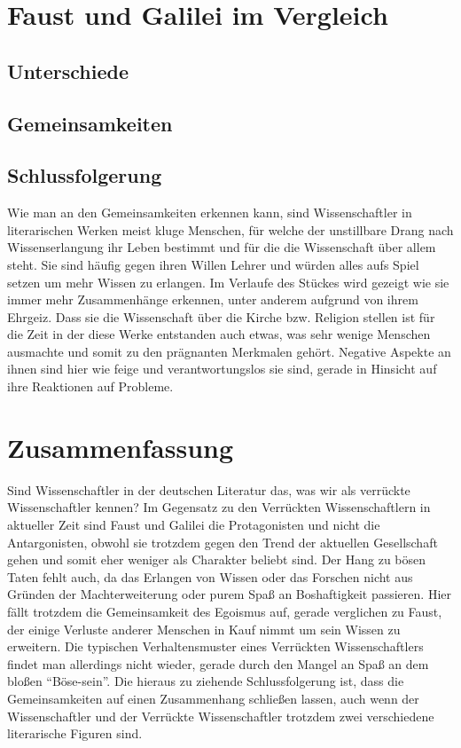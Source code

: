 \documentclass[12pt]{scrreprt}
\begin{document}
\chapter{Faust und Galilei im Vergleich}
	\label{chap:faust galilei vergleich}
\section{Unterschiede}
	\label{sec:unterschiede}

\section{Gemeinsamkeiten}
	\label{sec:gemeinsamkeiten}

\section{Schlussfolgerung}
	\label{sec:schlussfolgerung}
Wie man an den Gemeinsamkeiten erkennen kann, sind Wissenschaftler in literarischen Werken meist kluge Menschen, für welche der unstillbare Drang nach Wissenserlangung ihr Leben bestimmt und für die die Wissenschaft über allem steht.
Sie sind häufig gegen ihren Willen Lehrer und würden alles aufs Spiel setzen um mehr Wissen zu erlangen.
Im Verlaufe des Stückes wird gezeigt wie sie immer mehr Zusammenhänge erkennen, unter anderem aufgrund von ihrem Ehrgeiz.
Dass sie die Wissenschaft über die Kirche bzw. Religion stellen ist für die Zeit in der diese Werke entstanden auch etwas, was sehr wenige Menschen ausmachte und somit zu den prägnanten Merkmalen gehört.
Negative Aspekte an ihnen sind hier wie feige und verantwortungslos sie sind, gerade in Hinsicht auf ihre Reaktionen auf Probleme.

\chapter{Zusammenfassung}
	\label{chap:zusammenfassung}
Sind Wissenschaftler in der deutschen Literatur das, was wir als verrückte Wissenschaftler kennen?
Im Gegensatz zu den Verrückten Wissenschaftlern in aktueller Zeit sind Faust und Galilei die Protagonisten und nicht die Antargonisten, obwohl sie trotzdem gegen den Trend der aktuellen Gesellschaft gehen und somit eher weniger als Charakter beliebt sind.
Der Hang zu bösen Taten fehlt auch, da das Erlangen von Wissen oder das Forschen nicht aus Gründen der Machterweiterung oder purem Spaß an Boshaftigkeit passieren.
Hier fällt trotzdem die Gemeinsamkeit des Egoismus auf, gerade verglichen zu Faust, der einige Verluste anderer Menschen in Kauf nimmt um sein Wissen zu erweitern.
Die typischen Verhaltensmuster eines Verrückten Wissenschaftlers findet man allerdings nicht wieder, gerade durch den Mangel an Spaß an dem bloßen \enquote{Böse-sein}.
Die hieraus zu ziehende Schlussfolgerung ist, dass die Gemeinsamkeiten auf einen Zusammenhang schließen lassen, auch wenn der Wissenschaftler und der Verrückte Wissenschaftler trotzdem zwei verschiedene literarische Figuren sind.

\printbibliography
\end{document}
